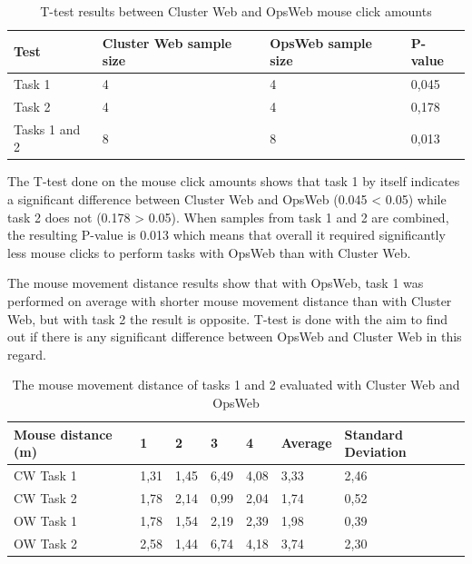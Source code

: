 \begin{table}[!ht]
\def\arraystretch{1.1}%
    \begin{center}
    \caption{T-test results between Cluster Web and OpsWeb mouse click amounts}
    \label{cw_ow_clicks_t_test}
    \begin{tabular}{| l | l | l | l | }
    \hline
    Test & Cluster Web sample size & OpsWeb sample size  & P-value   \\
    \hline
    Task 1 & 4 & 4 & 0,045 \\
    Task 2 & 4 & 4 & 0,178 \\
    Tasks 1 and 2 & 8 & 8 & 0,013 \\
    \hline
    \end{tabular}
    \end{center}
\end{table}

The T-test done on the mouse click amounts shows that task 1 by itself indicates a significant difference between Cluster Web and OpsWeb (0.045 < 0.05) while task 2 does not (0.178 > 0.05). When samples from task 1 and 2 are combined, the resulting P-value is 0.013 which means that overall it required significantly less mouse clicks to perform tasks with OpsWeb than with Cluster Web.

The mouse movement distance results show that with OpsWeb, task 1 was performed on average with shorter mouse movement distance than with Cluster Web, but with task 2 the result is opposite. T-test is done with the aim to find out if there is any significant difference between OpsWeb and Cluster Web in this regard.

\begin{table}[!ht]
\def\arraystretch{1.1}%
    \begin{center}
    \caption{The mouse movement distance of tasks 1 and 2 evaluated with Cluster Web and OpsWeb}
    \label{cw_ow_distances}
    \begin{tabular}{| l | l | l | l | l | l | l | }
    \hline
    Mouse distance (m) & 1  & 2  & 3  & 4  & Average & Standard Deviation \\
    \hline
    CW Task 1          & 1,31 & 1,45 & 6,49 & 4,08 & 3,33    & 2,46               \\
    CW Task 2          & 1,78 & 2,14 & 0,99 & 2,04 & 1,74    & 0,52               \\
    OW Task 1          & 1,78 & 1,54 & 2,19 & 2,39 & 1,98    & 0,39               \\
    OW Task 2          & 2,58 & 1,44 & 6,74 & 4,18 & 3,74    & 2,30              \\
    \hline
    \end{tabular}
    \end{center}
\end{table}

